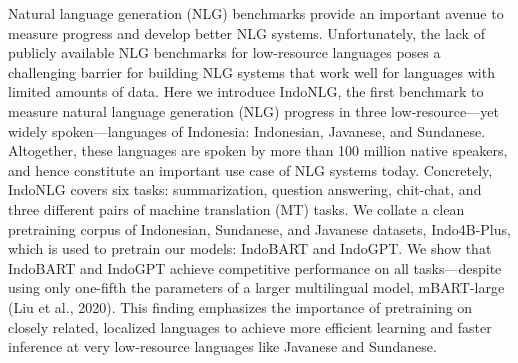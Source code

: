 Natural language generation (NLG) benchmarks provide an important avenue to measure progress and develop better NLG systems. Unfortunately, the lack of publicly available NLG benchmarks for low-resource languages poses a challenging barrier for building NLG systems that work well for languages with limited amounts of data. Here we introduce IndoNLG, the first benchmark to measure natural language generation (NLG) progress in three low-resource---yet widely spoken---languages of Indonesia: Indonesian, Javanese, and Sundanese. Altogether, these languages are spoken by more than 100 million native speakers, and hence constitute an important use case of NLG systems today. Concretely, IndoNLG covers six tasks: summarization, question answering, chit-chat, and three different pairs of machine translation (MT) tasks. We collate a clean pretraining corpus of Indonesian, Sundanese, and Javanese datasets, Indo4B-Plus, which is used to pretrain our models: IndoBART and IndoGPT. We show that IndoBART and IndoGPT achieve competitive performance on all tasks---despite using only one-fifth the parameters of a larger multilingual model, mBART-large (Liu et al., 2020). This finding emphasizes the importance of pretraining on closely related, localized languages to achieve more efficient learning and faster inference at very low-resource languages like Javanese and Sundanese.
